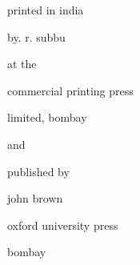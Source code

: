 {\small
\begin{center}
\sc printed in india

\medskip

by. r. subbu

\medskip

at the

\medskip

commercial printing press

\medskip

limited, bombay

\medskip

and

\medskip

published by

\medskip

john brown

\medskip

oxford university press

\medskip

bombay
\end{center}
}\relax

\vfill








